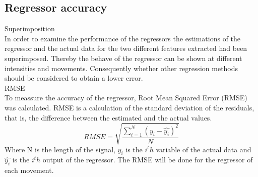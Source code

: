 \documentclass[a4paper, 10pt, conference]{ieeeconf}      %
\begin{document}
	\subsection{Regressor accuracy}
	Superimposition\\
	In order to examine the performance of the regressors the estimations of the regressor and the actual data for the two different features extracted had been superimposed. Thereby the behave of the regressor can be shown at different intensities and movements. Consequently whether other regression methods should be considered to obtain a lower error.\\
	RMSE\\
	To meassure the accuracy of the regressor, Root Mean Squared Error (RMSE) was calculated. RMSE is a calculation of the standard deviation of the residuals, that is, the difference between the estimated and the actual values.
	\begin{equation}
	RMSE = \sqrt{\frac{\sum\limits_{i=1}^N(y_i - \hat{y_i})^2}{N}}
	\end{equation}
	Where N is the length of the signal, $y_i$ is the $i^th$ variable of the actual data and $\hat{y_i}$ is the $i^th$ output of the regressor. The RMSE will be done for the regressor of each movement.\\
	
	
	
	
\end{document}
